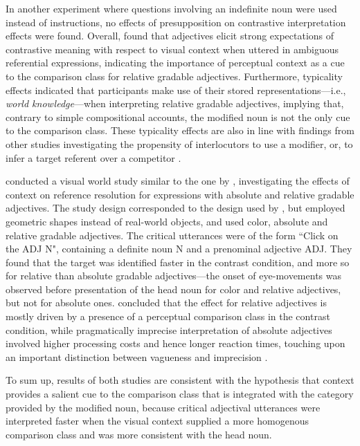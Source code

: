  In another experiment where questions involving an indefinite noun were used instead of instructions,  no effects of presupposition on contrastive interpretation effects were found.
 Overall, \textcite{sedivy1999} found that adjectives elicit strong expectations of contrastive meaning with respect to visual context when uttered in ambiguous referential expressions, indicating the importance of perceptual context as a cue to the comparison class for relative gradable adjectives. Furthermore, typicality effects indicated that participants make use of their stored representations---i.e., \textit{world knowledge}---when interpreting relative gradable adjectives, implying that, contrary to simple compositional accounts, the modified noun is not the only cue to the comparison class. 
These typicality effects are also in line with findings from other studies investigating the propensity of interlocutors to use a modifier, or, to infer a target referent over a competitor \parencite{KreissDegen2020, bergey2020}.
  
\textcite{Aparicio2016} conducted a visual world study similar to the one by \textcite{sedivy1999}, investigating the effects of context on reference resolution for expressions with absolute and relative gradable adjectives. 
The study design corresponded to the design used by \textcite{sedivy1999}, but employed geometric shapes instead of real-world objects, and used color, absolute and relative gradable adjectives.  The critical utterances were of the form ``Click on the ADJ N", containing a definite noun N and a prenominal adjective ADJ. They found that the target was identified faster in the contrast condition, and more so for relative than absolute gradable adjectives---the onset of eye-movements was observed before presentation of the head noun for color and relative adjectives, but not for absolute ones. \textcite{Aparicio2016} concluded that the effect for relative adjectives is mostly driven by a presence of a perceptual comparison class in the contrast condition, while pragmatically imprecise interpretation of absolute adjectives involved higher processing costs and hence longer reaction times, touching upon an important distinction between vagueness and imprecision \parencite[cf.][]{Kennedy2007}. 

To sum up, results of both studies are consistent with the  hypothesis that context provides a salient cue to the comparison class that is integrated with the category provided by the modified  noun, because critical adjectival utterances were interpreted faster when the visual context supplied a more homogenous comparison class and was more consistent with the head noun. 

